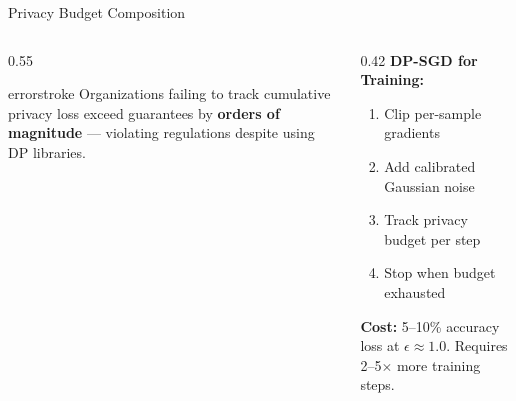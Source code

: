 \documentclass[aspectratio=169, 12pt]{beamer}
\begin{document}
\begin{frame}{Privacy Budget Composition}
\begin{columns}[T]
\begin{column}{0.55\textwidth}
    \vspace{0.1cm}
    \begin{mlsyscard}{errorstroke}
    {\footnotesize Organizations failing to track cumulative privacy loss exceed guarantees by \textbf{orders of magnitude} --- violating regulations despite using DP libraries.}
    \end{mlsyscard}
  \end{column}
  \begin{column}{0.42\textwidth}
    {\footnotesize\textbf{DP-SGD for Training:}}
    \vspace{0.1cm}
    \begin{enumerate}\setlength\itemsep{1pt}
      \item[\footnotesize 1.] Clip per-sample gradients
      \item[\footnotesize 2.] Add calibrated Gaussian noise
      \item[\footnotesize 3.] Track privacy budget per step
      \item[\footnotesize 4.] Stop when budget exhausted
    \end{enumerate}

    \vspace{0.15cm}
    {\footnotesize\textbf{Cost:} 5--10\% accuracy loss at $\epsilon \approx 1.0$. Requires 2--5$\times$ more training steps.}
  \end{column}
\end{columns}

\end{frame}
\end{document}
